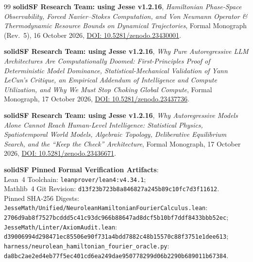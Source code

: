 \documentclass[11pt,letterpaper]{article}
\theoremstyle{definition}
\begin{document}
\begin{thebibliography}{99}
\textbf{solidSF Research Team: using Jesse v1.2.16}, \emph{Hamiltonian Phase-Space Observability, Forced Navier--Stokes Computation, and Von Neumann Operator \& Thermodynamic Resource Bounds on Dynamical Trajectories}, Formal Monograph (Rev.~5), 16 October 2026, \href{https://doi.org/10.5281/zenodo.23430001}{DOI: 10.5281/zenodo.23430001}.

\textbf{solidSF Research Team: using Jesse v1.2.16}, \emph{Why Pure Autoregressive LLM Architectures Are Computationally Doomed: First-Principles Proof of Deterministic Model Dominance, Statistical-Mechanical Validation of Yann LeCun's Critique, an Empirical Addendum of Intelligence and Compute Utilization, and Why We Must Stop Choking Global Compute}, Formal Monograph, 17 October 2026, \href{https://doi.org/10.5281/zenodo.23437736}{DOI: 10.5281/zenodo.23437736}.

\textbf{solidSF Research Team: using Jesse v1.2.16}, \emph{Why Autoregressive Models Alone Cannot Reach Human-Level Intelligence: Statistical Physics, Spatiotemporal World Models, Algebraic Topology, Deliberative Equilibrium Search, and the ``Keep the Check'' Architecture}, Formal Monograph, 17 October 2026, \href{https://doi.org/10.5281/zenodo.23436671}{DOI: 10.5281/zenodo.23436671}.

\textbf{solidSF Pinned Formal Verification Artifacts}:\\
Lean~4 Toolchain: \nolinkurl{leanprover/lean4:v4.34.1};\\
Mathlib~4 Git Revision: \nolinkurl{d13f23b723b8a846827a245b89c10fc7d3f11612}.\\
Pinned SHA-256 Digests:\\
\nolinkurl{JesseMath/Unified/NeuroleanHamiltonianFourierCalculus.lean}:\\
\nolinkurl{2706d9ab8f7527bcddd5c41c93dc966b88647ad8dcf5b10bf7ddf8433bbb52ec};\\
\nolinkurl{JesseMath/Linter/AxiomAudit.lean}:\\
\nolinkurl{d39006994d298471ec85506e90f731a4bdd7882c48b15570c88f3751e1dee613};\\
\nolinkurl{harness/neurolean_hamiltonian_fourier_oracle.py}:\\
\nolinkurl{da8bc2ae2ed4eb77f5ec401cd6ea249dae950778299d06b2290b689011b67384}.

\end{thebibliography}
\end{document}
